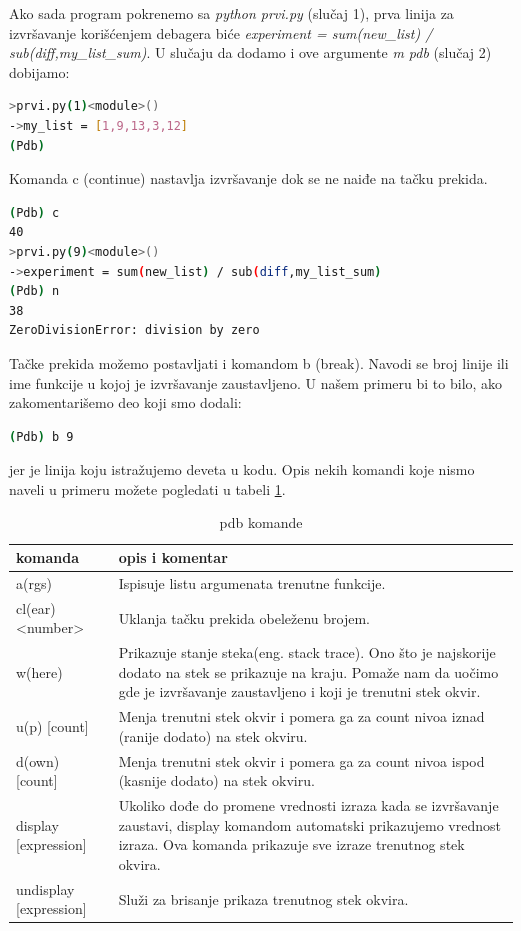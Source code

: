 \documentclass[a4paper]{article}
\begin{document}
Ako sada program pokrenemo sa \emph{python prvi.py} (slučaj 1), prva linija za izvršavanje korišćenjem debagera biće \emph{experiment = sum(new\_list) / sub(diff,my\_list\_sum)}. U slučaju da dodamo i ove argumente \emph{\textendash m  pdb} (slučaj 2) dobijamo:
\begin{lstlisting}[language = bash, caption={U slučaju 2 izvršavanje kreće od prve linije}]
>prvi.py(1)<module>()
->my_list = [1,9,13,3,12]
(Pdb)
\end{lstlisting}
Komanda c (continue) nastavlja izvršavanje dok se ne naiđe na tačku prekida.
\begin{lstlisting}[language = bash, caption={Nastavlja se izvršavanje do tačke prekida i izvršava sledeću liniju}]
(Pdb) c
40
>prvi.py(9)<module>()
->experiment = sum(new_list) / sub(diff,my_list_sum)
(Pdb) n
38
ZeroDivisionError: division by zero
\end{lstlisting}

Tačke prekida možemo postavljati i komandom b (break). Navodi se broj linije ili ime funkcije u kojoj je izvršavanje zaustavljeno. U našem primeru bi to bilo, ako zakomentarišemo deo koji smo dodali:
\begin{lstlisting}[language = bash, caption={Na liniji 9 postavljamo tačku prekida}]
(Pdb) b 9 
\end{lstlisting}
jer je linija koju istražujemo deveta u kodu.
Opis nekih komandi koje nismo naveli u primeru možete pogledati u tabeli \ref{tab:tabela1}.

\begin{table}[h!]
\begin{center}
\caption{pdb komande}
 \begin{tabular}{||p{4cm} p{7cm}||} 
 \hline
  komanda &      opis i komentar \\ [2.0ex] 
 \hline\hline
  a(rgs) & Ispisuje listu argumenata trenutne funkcije.  \\  [2ex]   
 \hline
 cl(ear) <number> & Uklanja tačku prekida obeleženu brojem.  \\ [2ex]
 \hline
 w(here) & Prikazuje stanje steka(eng. stack trace). Ono što je najskorije dodato na stek se prikazuje na kraju. Pomaže nam da uočimo gde je izvršavanje zaustavljeno i koji je trenutni stek okvir. \\ [2ex]
 \hline
 u(p) [count] & Menja trenutni stek okvir i pomera ga za count nivoa iznad (ranije dodato) na stek okviru.  \\ [2ex]
  \hline
 d(own) [count] & Menja trenutni stek okvir i pomera ga za count nivoa ispod (kasnije dodato) na stek okviru.  \\ [2ex] 
 \hline
  \hline
 display [expression] & Ukoliko dođe do promene vrednosti izraza kada se izvršavanje zaustavi, display komandom automatski prikazujemo vrednost izraza. Ova komanda prikazuje sve izraze trenutnog stek okvira.\\ [2ex] 
 \hline
 \hline
 undisplay [expression] & Služi za brisanje prikaza trenutnog stek okvira.  \\ [2ex] 
 \hline
\end{tabular}
\label{tab:tabela1}
\end{center}
\end{table}
\end{document}
